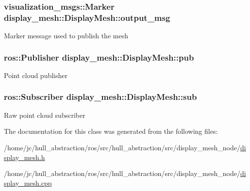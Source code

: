 \subsubsection[{\texorpdfstring{output\+\_\+msg}{output_msg}}]{\setlength{\rightskip}{0pt plus 5cm}visualization\+\_\+msgs\+::\+Marker display\+\_\+mesh\+::\+Display\+Mesh\+::output\+\_\+msg\hspace{0.3cm}{\ttfamily [private]}}\hypertarget{classdisplay__mesh_1_1_display_mesh_a950554fa9242f3d358e1085955e37a5b}{}\label{classdisplay__mesh_1_1_display_mesh_a950554fa9242f3d358e1085955e37a5b}
Marker message used to publish the mesh 
\subsubsection[{\texorpdfstring{pub}{pub}}]{\setlength{\rightskip}{0pt plus 5cm}ros\+::\+Publisher display\+\_\+mesh\+::\+Display\+Mesh\+::pub\hspace{0.3cm}{\ttfamily [private]}}\hypertarget{classdisplay__mesh_1_1_display_mesh_ad2ede578fe0dae783e9e06942441e2be}{}\label{classdisplay__mesh_1_1_display_mesh_ad2ede578fe0dae783e9e06942441e2be}
Point cloud publisher 
\subsubsection[{\texorpdfstring{sub}{sub}}]{\setlength{\rightskip}{0pt plus 5cm}ros\+::\+Subscriber display\+\_\+mesh\+::\+Display\+Mesh\+::sub\hspace{0.3cm}{\ttfamily [private]}}\hypertarget{classdisplay__mesh_1_1_display_mesh_a0cef4c6f1b95ba3ad39a470e277bbe7e}{}\label{classdisplay__mesh_1_1_display_mesh_a0cef4c6f1b95ba3ad39a470e277bbe7e}
Raw point cloud subscriber 

The documentation for this class was generated from the following files\+:\begin{DoxyCompactItemize}
\item 
/home/jc/hull\+\_\+abstraction/ros/src/hull\+\_\+abstraction/src/display\+\_\+mesh\+\_\+node/\hyperlink{display__mesh_8h}{display\+\_\+mesh.\+h}\item 
/home/jc/hull\+\_\+abstraction/ros/src/hull\+\_\+abstraction/src/display\+\_\+mesh\+\_\+node/\hyperlink{display__mesh_8cpp}{display\+\_\+mesh.\+cpp}\end{DoxyCompactItemize}

